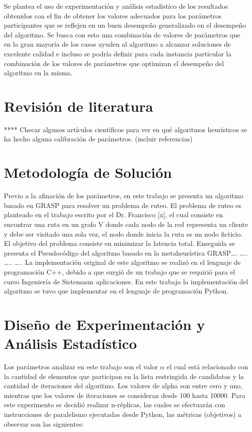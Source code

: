 \documentclass{article}
\begin{document}
Se plantea el uso de experimentación y análisis estadístico de los resultados obtenidos con el fin de obtener los valores adecuados para los parámetros participantes que se reflejen en un buen desempeño generalizado en el desempeño del algoritmo. Se busca con esto una combinación de valores de parámetros que en la gran mayoría de los casos ayuden al algoritmo a alcanzar soluciones de excelente calidad e incluso se podría definir para cada instancia particular la combinación de los valores de parámetros que optimizan el desempeño del algoritmo en la misma.\\
	

\section{Revisión de literatura}

**** Checar algunos artículos científicos para ver en qué algoritmos heurísticos se ha hecho alguna calibración de parámetros.  (incluir referencias)

\section{Metodología de Solución}

Previo a la afinación de los parámetros, en este trabajo se presenta un algoritmo basado en GRASP para resolver un problema de ruteo. El problema de ruteo es planteado en el trabajo escrito por el Dr. Francisco [x], el cual consiste en encontrar una ruta en un grafo V donde cada nodo de la red representa un cliente y debe ser visitado una sola vez, el nodo donde inicia la ruta es un nodo ficticio. El objetivo del problema consiste en minimizar la latencia total.
Enseguida se presenta el Pseudocódigo  del algoritmo basado en la metaheurística GRASP….
…..
…..
…..
La implementación original de este algoritmo se realizó en el lenguaje de programación C++, debido a que surgió de un trabajo que se requirió para el curso Ingeniería de Sistemasm aplicaciones. En este trabajo la implementación del algoritmo se tuvo que implementar en el lenguaje de programación Python.


\section{Diseño de Experimentación y Análisis Estadístico}
Los parámetros analizar en este trabajo son el valor $\alpha$ el cual está relacionado con la cantidad de elementos que participan en la lista restringida de candidatos  y la cantidad de iteraciones del algoritmo. Los valores de alpha son entre cero y uno, mientras que los valores de iteraciones se consideran desde 100 hasta 10000. Para este experimento se decidió realizar n-réplicas, las cuales se efectuarán con instrucciones de paralelismo ejecutadas desde Python, las métricas (objetivos) a observar son las siguientes:\\
\end{document}
